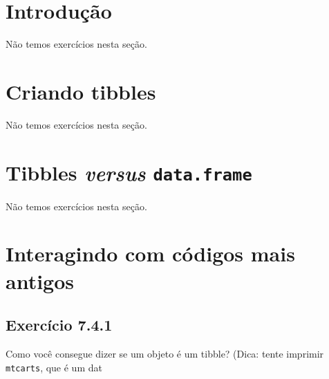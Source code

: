 \documentclass[
]{latex/krantz}
\theoremstyle{definition}
\theoremstyle{definition}
\theoremstyle{definition}
\theoremstyle{definition}
\theoremstyle{remark}
\begin{document}
\hypertarget{introduuxe7uxe3o-3}{%
\section{Introdução}\label{introduuxe7uxe3o-3}}

Não temos exercícios nesta seção.

\hypertarget{criando-tibbles}{%
\section{Criando tibbles}\label{criando-tibbles}}

Não temos exercícios nesta seção.

\hypertarget{tibbles-versus-data.frame}{%
\section{\texorpdfstring{Tibbles \emph{versus} \texttt{data.frame}}{Tibbles versus data.frame}}\label{tibbles-versus-data.frame}}

Não temos exercícios nesta seção.

\hypertarget{interagindo-com-cuxf3digos-mais-antigos}{%
\section{Interagindo com códigos mais antigos}\label{interagindo-com-cuxf3digos-mais-antigos}}

\hypertarget{exr7-4-1}{%
\subsection*{Exercício 7.4.1}\label{exr7-4-1}}

Como você consegue dizer se um objeto é um tibble? (Dica: tente imprimir \texttt{mtcarts}, que é um dat
\end{document}
